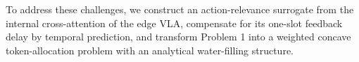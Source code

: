 \documentclass[lettersize,journal]{IEEEtran}
\theoremstyle{custom}
\newtheorem{Prob}{Problem}
\begin{document}
To address these challenges, we construct an action-relevance surrogate from the internal cross-attention of the edge VLA, compensate for its one-slot feedback delay by temporal prediction, and transform Problem 1 into a weighted concave token-allocation problem with an analytical water-filling structure. 

\end{document}
